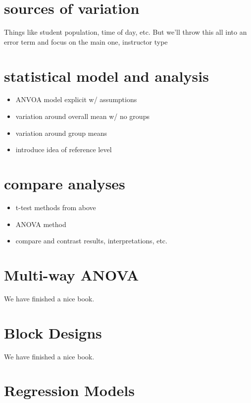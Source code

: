 \documentclass[]{book}
\providecommand{\tightlist}{%
  \setlength{\itemsep}{0pt}\setlength{\parskip}{0pt}}
\theoremstyle{definition}
\theoremstyle{definition}
\theoremstyle{definition}
\theoremstyle{remark}
\begin{document}
\chapter{sources of variation}\label{sources-of-variation}

Things like student population, time of day, etc. But we'll throw this
all into an error term and focus on the main one, instructor type

\chapter{statistical model and
analysis}\label{statistical-model-and-analysis}

\begin{itemize}
\tightlist
\item
  ANVOA model explicit w/ assumptions
\item
  variation around overall mean w/ no groups
\item
  variation around group means
\item
  introduce idea of reference level
\end{itemize}

\chapter{compare analyses}\label{compare-analyses}

\begin{itemize}
\tightlist
\item
  t-test methods from above
\item
  ANOVA method
\item
  compare and contrast results, interpretations, etc.
\end{itemize}

\chapter{Multi-way ANOVA}\label{multiway}

We have finished a nice book.

\chapter{Block Designs}\label{block}

We have finished a nice book.

\chapter{Regression Models}\label{regression}
\end{document}
